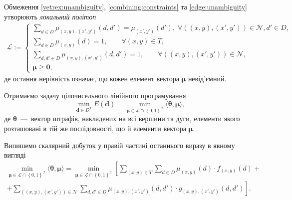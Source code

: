 Обмеження \eqref{vetrex:unambiguity}, \eqref{combining:constraints} та
\eqref{edge:unambiguity} утворюють \textit{локальний політоп}
\begin{equation} \label{local:polytop}
\begin{gathered}
    \mathcal{L} :=
    \begin{cases}
        \sum \limits_{d \in D}
            \mu_{\left(x, y \right), \left(x', y' \right)} \left(d, d' \right) =
            \mu_{\left(x', y' \right)} \left(d' \right), \;
        \forall
        \left( \left(x, y \right), \left(x',y' \right) \right) \in \mathcal{N},
        d' \in D, \\
        \sum \limits_{d \in D} \mu_{\left( x, y \right)} \left( d \right) = 1,
        \qquad \forall \left(x, y \right) \in T, \\
        \sum \limits_{d, d' \in D}
            \mu_{\left(x, y \right), \left(x', y' \right)} \left(
                d, d'
            \right) = 1, \qquad \forall
            \left(\left(x, y \right), \left(x', y' \right) \right) \in
                \mathcal{N}, \\
        \pmb{\mu} \ge \pmb{0},
    \end{cases}
\end{gathered}
\end{equation}
де остання нерівність означає, що кожен елемент вектора $\pmb{\mu}$ невід'ємний.

Отримаємо задачу цілочисельного лінійного програмування
\begin{equation*}
    \min \limits_{\pmb{d} \in D^T} E \left( \pmb{d} \right) =
    \min \limits_{\pmb{\mu} \in \mathcal{L} \cap \left\{ 0, 1 \right\}^{\mathcal{I}}}
        \langle \pmb{\theta}, \pmb{\mu} \rangle,
\end{equation*}
де $\pmb{\theta}$~---~вектор штрафів, накладених на всі вершини та дуги,
елементи якого розташовані в тій же послідовності,
що й елементи вектора $\pmb{\mu}$.

Випишемо скалярний добуток у правій частині останнього виразу в явному вигляді
\begin{equation} \label{ILP:MAP:inference}
\begin{gathered}
    \min \limits_{\pmb{\mu} \in \mathcal{L} \cap \left\{ 0, 1 \right\}^{\mathcal{I}}}
        \langle \pmb{\theta}, \pmb{\mu} \rangle =
    \min \limits_{\pmb{\mu} \in \mathcal{L} \cap \left\{ 0, 1 \right\}^{\mathcal{I}}}
        \left[
            \sum \limits_{\left(x, y \right) \in T}
                \sum \limits_{d \in D}
                    \mu_{\left(x, y \right)} \left(d \right) \cdot
                    f_{\left(x, y \right)} \left( d \right) + \right. \\
            + \left.
            \sum \limits_{\left(\left(x, y \right), \left(x', y' \right) \right) \in \mathcal{N}}
                \sum \limits_{d, d' \in D}
                    \mu_{\left(x, y \right), \left(x', y' \right)} \left(
                        d, d'
                    \right) \cdot
                    g_{\left(x, y \right), \left(x', y' \right)} \left(
                        d, d'
                    \right)
        \right].
\end{gathered}
\end{equation}

